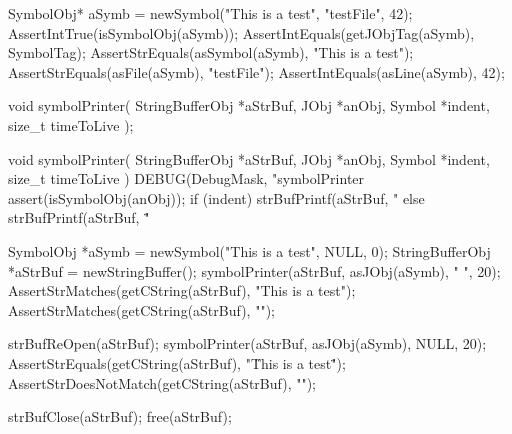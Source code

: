 
\startCTest
  SymbolObj* aSymb = newSymbol("This is a test", "testFile", 42);
  AssertIntTrue(isSymbolObj(aSymb));
  AssertIntEquals(getJObjTag(aSymb), SymbolTag);
  AssertStrEquals(asSymbol(aSymb), "This is a test");
  AssertStrEquals(asFile(aSymb), "testFile");
  AssertIntEquals(asLine(aSymb), 42);
\stopCTest
\stopTestCase
\stopTestSuite

\startTestSuite[symbolPrinter]

\startCHeader
void symbolPrinter(
  StringBufferObj *aStrBuf,
  JObj            *anObj,
  Symbol          *indent,
  size_t           timeToLive
);
\stopCHeader

\startCCode
void symbolPrinter(
  StringBufferObj *aStrBuf,
  JObj            *anObj,
  Symbol          *indent,
  size_t           timeToLive
) {
  DEBUG(DebugMask, "symbolPrinter %
  assert(isSymbolObj(anObj));
  if (indent) {
    strBufPrintf(aStrBuf, "%
  } else {
    strBufPrintf(aStrBuf, "\"%
  }
}
\stopCCode


\startCTest
  SymbolObj *aSymb = newSymbol("This is a test", NULL, 0);
  StringBufferObj *aStrBuf = newStringBuffer();
  symbolPrinter(aStrBuf, asJObj(aSymb), "  ", 20);
  AssertStrMatches(getCString(aStrBuf), "This is a test");
  AssertStrMatches(getCString(aStrBuf), "\n");
  
  strBufReOpen(aStrBuf);
  symbolPrinter(aStrBuf, asJObj(aSymb), NULL, 20);
  AssertStrEquals(getCString(aStrBuf), "\"This is a test\" ");
  AssertStrDoesNotMatch(getCString(aStrBuf), "\n");
  
  strBufClose(aStrBuf);
  free(aStrBuf);
\stopCTest

\stopTestCase
\stopTestSuite